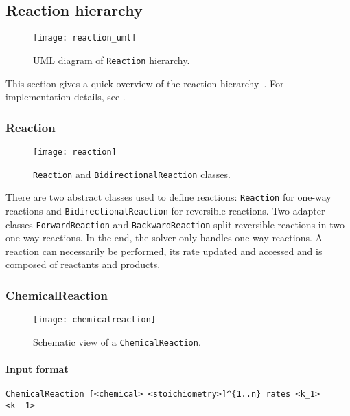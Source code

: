 
\subsection{Reaction hierarchy}

\begin{figure}[!h]
  \centering
  \texttt{[image: reaction\_uml]}
  \caption{UML diagram of \texttt{Reaction} hierarchy.}
\label{fig:reaction_uml}
\end{figure}

This section gives a quick overview of the reaction hierarchy~.
For implementation details, see .

\subsubsection{Reaction}

\begin{figure}[!h]
  \centering
  \texttt{[image: reaction]}
  \caption{\texttt{Reaction} and \texttt{BidirectionalReaction} classes.}
\label{fig:reaction}
\end{figure}

There are two abstract classes used to define reactions:
\texttt{Reaction} for one-way reactions and \texttt{BidirectionalReaction} for reversible reactions.
Two adapter classes \texttt{ForwardReaction} and \texttt{BackwardReaction}
split reversible reactions in two one-way reactions.
In the end, the solver only handles one-way reactions.
A reaction can necessarily be performed,
its rate updated and accessed and is composed of reactants and products.

\subsubsection{ChemicalReaction}

\begin{figure}[!h]
  \centering
  \texttt{[image: chemicalreaction]}
  \caption{Schematic view of a \texttt{ChemicalReaction}.}
\label{fig:chemical_reaction}
\end{figure}

\paragraph{Input format}
\begin{verbatim}
ChemicalReaction [<chemical> <stoichiometry>]^{1..n} rates <k_1> <k_-1>
\end{verbatim}

